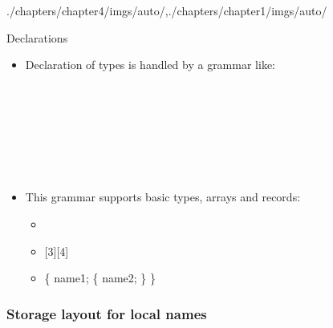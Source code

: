 \begin{graphicspathcontext}{{./chapters/chapter4/imgs/auto/},{./chapters/chapter1/imgs/auto/}}
\begin{bibunit}[apalike]
\begin{frame}[background=8]{Declarations}
	\begin{itemize}
	\item Declaration of types is handled by a grammar like:
		\begin{minipage}[t]{.6\linewidth}
			\vspace{-.75cm}
			\begin{bnf}
				 \\
				\bnfalt*{\bnfes} \\
				 \\
				 \\
				 \\
				 \\
				\bnfalt*{\bnfes}
			\end{bnf}
		\end{minipage}
	\item This grammar supports basic types, arrays and records:
		\begin{itemize}
		\item {}
		\item {}
		\item {} \{  name1;  \{  name2; \} \}
		\end{itemize}
	\end{itemize}
\end{frame}

\subsubsection{Storage layout for local names}
\subsubsectiontableofcontentslide


\end{bibunit}
\end{graphicspathcontext}

